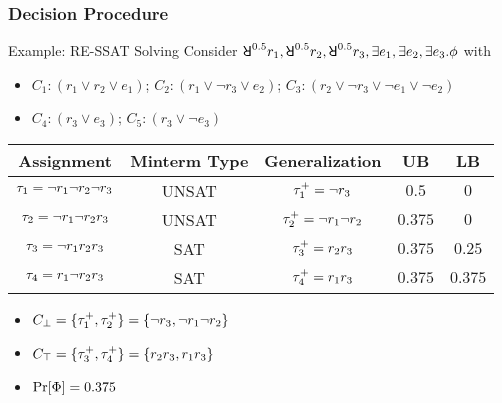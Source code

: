 \begin{frame}
  \frametitle{Decision Procedure}
  \begin{block}{Example: RE-SSAT Solving}
    Consider $\random{0.5}r_1,\random{0.5}r_2,\random{0.5}r_3,\exists e_1,\exists e_2,\exists e_3.\pf$ with
    \begin{itemize}
      \item[] $C_1: (r_1 \lor r_2 \lor e_1)$; $C_2: (r_1 \lor \lnot r_3 \lor e_2)$; $C_3: (r_2 \lor \lnot r_3 \lor \lnot e_1 \lor \lnot e_2)$
      \item[] $C_4: (r_3 \lor e_3)$; $C_5: (r_3 \lor \lnot e_3)$
    \end{itemize}
    \pause
    \begin{table}[t]
      \centering
      \small
      \begin{tabular}{c|c|c|c|c}
        Assignment                            & Minterm Type & Generalization                & UB      & LB      \\
        \hline
        $\tau_1=\lnot r_1 \lnot r_2 \lnot r_3$ & UNSAT        & $\tau_1^+=\lnot r_3$           & $0.5$   & $0$     \\
        \pause
        $\tau_2=\lnot r_1 \lnot r_2 r_3$       & UNSAT        & $\tau_2^+=\lnot r_1 \lnot r_2$ & $0.375$ & $0$     \\
        \pause
        $\tau_3=\lnot r_1 r_2 r_3$             & SAT          & $\tau_3^+=r_2r_3$              & $0.375$ & $0.25$  \\
        \pause
        $\tau_4=r_1 \lnot r_2 r_3$             & SAT          & $\tau_4^+=r_1r_3$              & $0.375$ & $0.375$
      \end{tabular}
    \end{table}
    \pause
    \begin{itemize}
      \item $C_\bot=\{\tau_1^+,\tau_2^+\}=\{\lnot r_3,\lnot r_1 \lnot r_2\}$
      \item $C_\top=\{\tau_3^+,\tau_4^+\}=\{r_2r_3,r_1r_3\}$
      \item $\Pr[\Phi]=0.375$
    \end{itemize}
  \end{block}
\end{frame}


